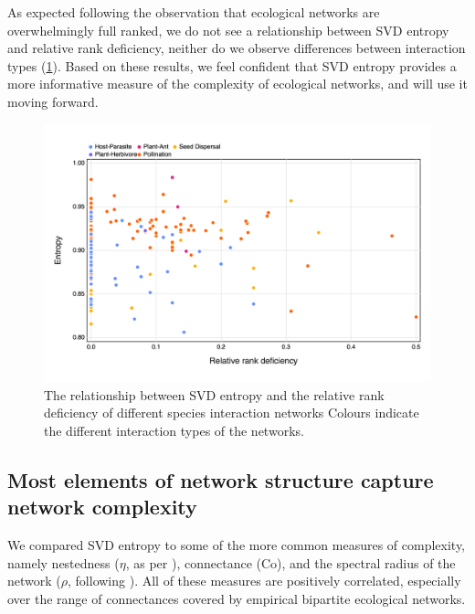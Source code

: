 \begin{refsection}
As expected following the observation that ecological networks are
overwhelmingly full ranked, we do not see a relationship between SVD entropy and
relative rank deficiency, neither do we observe differences between interaction
types (\ref{fig:entropy_v_rank}). Based on these results, we feel confident that
SVD entropy provides a more informative measure of the complexity of ecological
networks, and will use it moving forward.

\begin{figure}[h]
    \centering
    \includegraphics[width=\textwidth]{figures/entropy_v_rank.png}
    \caption{The relationship between SVD entropy and the relative rank
deficiency of different species interaction networks Colours indicate the
different interaction types of the networks.}
    \label{fig:entropy_v_rank}
\end{figure}

\subsection{Most elements of network structure capture network
complexity}\label{most-elements-of-network-structure-capture-network-complexity}

We compared SVD entropy to some of the more common measures of complexity,
namely nestedness (\(\eta\), as per \cite{Bastolla2009ArcMut}),
connectance (\(\text{Co}\)), and the spectral radius of the network (\(\rho\),
following \cite{Staniczenko2013GhoNes}). All of these measures are
positively correlated, especially over the range of connectances covered by
empirical bipartite ecological networks.


\end{refsection}
